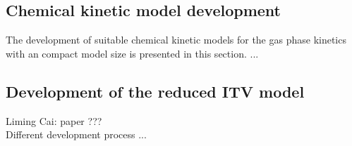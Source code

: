\begin{refsection}
% 
 
 
\section{Chemical kinetic model development}
The development of suitable chemical kinetic models for the gas phase kinetics with an compact model size is presented in this section. ...




\subsection{Development of the reduced ITV model}
Liming Cai: paper ???
\\
Different development process ...
 
 
 

\end{refsection}
